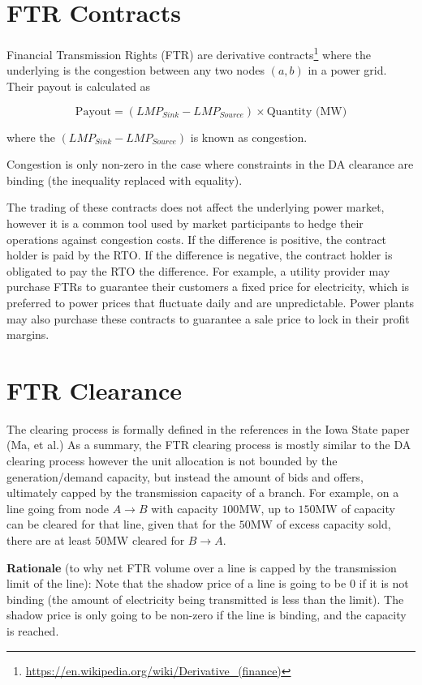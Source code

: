 \documentclass[11pt]{article}
\begin{document}
\section{FTR Contracts}
Financial Transmission Rights (FTR) are derivative contracts\footnote{\url{https://en.wikipedia.org/wiki/Derivative_(finance)}} where the underlying is the congestion between any two nodes $(a, b)$ in a power grid. Their payout is calculated as

$$\text{Payout} = (LMP_{Sink} - LMP_{Source}) \times \text{Quantity (MW)}$$

where the $(LMP_{Sink} - LMP_{Source})$ is known as congestion.

Congestion is only non-zero in the case where constraints in the DA clearance are binding (the inequality replaced with equality).

The trading of these contracts does not affect the underlying power market, however it is a common tool used by market participants to hedge their operations against congestion costs. If the difference is positive, the contract holder is paid by the RTO. If the difference is negative, the contract holder is obligated to pay the RTO the difference. For example, a utility provider may purchase FTRs to guarantee their customers a fixed price for electricity, which is preferred to power prices that fluctuate daily and are unpredictable. Power plants may also purchase these contracts to guarantee a sale price to lock in their profit margins.

\newpage
\section{FTR Clearance}
The clearing process is formally defined in the references in the Iowa State paper (Ma, et al.) As a summary, the FTR clearing process is mostly similar to the DA clearing process however the unit allocation is not bounded by the generation/demand capacity, but instead the amount of bids and offers, ultimately capped by the transmission capacity of a branch. For example, on a line going from node $A \rightarrow B$ with capacity $100\text{MW}$, up to $150\text{MW}$ of capacity can be cleared for that line, given that for the $50\text{MW}$ of excess capacity sold, there are at least $50\text{MW}$ cleared for $B \rightarrow A$.

\textbf{Rationale} (to why net FTR volume over a line is capped by the transmission limit of the line): Note that the shadow price of a line is going to be 0 if it is not binding (the amount of electricity being transmitted is less than the limit). The shadow price is only going to be non-zero if the line is binding, and the capacity is reached.
\end{document}
